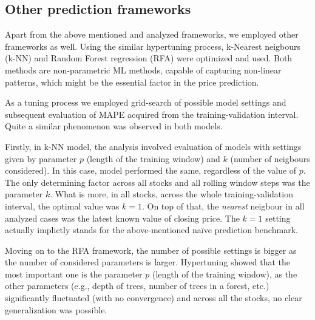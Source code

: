 \documentclass{svk_en}
\begin{document}
\subsection{Other prediction frameworks}
Apart from the above mentioned and analyzed frameworks, we employed other frameworks as well.
Using the similar hypertuning process, k-Nearest neigbours (k-NN) and Random Forest regression (RFA) were optimized and used.
Both methods are non-parametric ML methods, capable of capturing non-linear patterns, which might be the essential factor in the price prediction.

As a tuning process we employed grid-search of possible model settings and subsequent evaluation of MAPE acquired from the training-validation interval.
Quite a similar phenomenon was observed in both models.

Firstly, in k-NN model, the analysis involved evaluation of models with settings given by parameter $p$ (length of the training window) and $k$ (number of neigbours considered).
In this case, model performed the same, regardless of the value of $p$. The only determining factor across all stocks and all rolling window steps was the parameter $k$. What is more, in all stocks,
across the whole training-validation interval, the optimal value was $k = 1$. On top of that, the \textit{nearest} neigbour in all analyzed cases was the latest known value of closing price.
The $k = 1$ setting actually implictly stands for the above-mentioned naïve prediction benchmark.

Moving on to the RFA framework, the number of possible settings is bigger as the number of considered parameters is larger.
Hypertuning showed that the most important one is the parameter $p$ (length of the training window), as the other parameters (e.g., depth of trees, number of trees in a forest, etc.)
significantly fluctuated (with no convergence) and across all the stocks, no clear generalization was possible.
\end{document}
